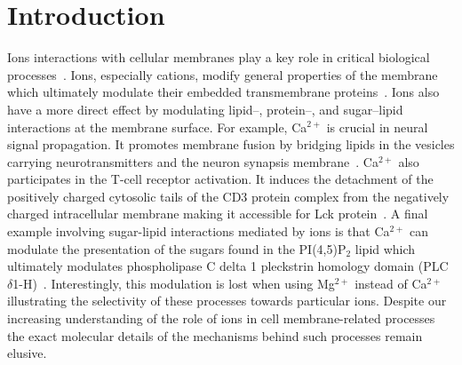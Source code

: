 \documentclass[aip,jcp,twocolumn]{revtex4}
\begin{document}
\maketitle %



\section{Introduction}
Ions interactions with cellular membranes play a key role in critical biological processes~\cite{REF_REVIEW}. Ions, especially cations, modify general properties of the membrane which ultimately modulate their embedded transmembrane proteins~\cite{REF}. Ions also have a more direct effect by modulating lipid--, protein--, and sugar--lipid interactions at the membrane surface. For example, Ca$^{2+}$  is crucial in neural signal propagation. It promotes membrane fusion by bridging lipids in the vesicles carrying neurotransmitters and the neuron synapsis membrane~\cite{REF}. Ca$^{2+}$ also participates in the T-cell receptor activation. It induces the detachment of the positively charged cytosolic tails of the CD3 protein complex from the negatively charged intracellular membrane making it accessible for Lck protein~\cite{Shi2013}. A final example involving sugar-lipid interactions mediated by ions is that Ca$^{2+}$ can modulate the presentation of the sugars found in the PI(4,5)P$_2$ lipid which ultimately modulates phospholipase C delta 1 pleckstrin homology domain (PLC $\delta$1-H)~\cite{Bilkova2017Calcium}. Interestingly, this modulation is lost when using Mg$^{2+}$ instead of Ca$^{2+}$ illustrating the selectivity of these processes towards particular ions. Despite our increasing understanding of the role of ions in cell membrane-related processes the exact molecular details of the mechanisms behind such processes remain elusive.
\end{document}
